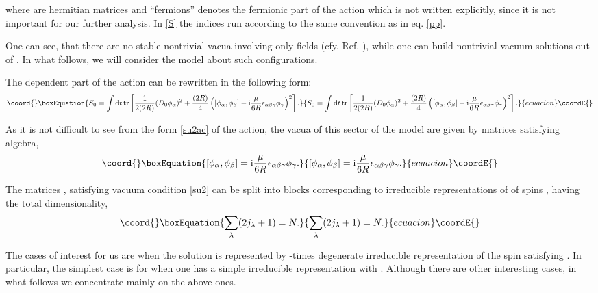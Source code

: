\documentclass[a4paper]{article}
\providecommand{\ii}{\mathrm{i}}
\providecommand{\dd}{\mathrm{d}}
\providecommand{\tr}{\mathop{\mathrm{tr}}\nolimits}
\begin{document}
where \coordHE{} are \coordHE{} hermitian matrices and ``fermions''
denotes the fermionic part of the action which is not written
explicitly, since it is not important for our further analysis. In
\eqref{S} the indices run according to the same convention as in
eq. \eqref{pp}.

One can see, that there are no stable nontrivial vacua involving
only fields \myHighlight{$\phi_\mu$}\coordHE{} (cfy. Ref. \cite{Valtancoli:2002rx}), while
one can build nontrivial vacuum solutions out of \myHighlight{$\phi_\alpha$}\coordHE{}. In
what follows, we will consider the model about such
configurations.

The \myHighlight{$\phi_\alpha$}\coordHE{} dependent part of the action can be rewritten in
the following form:
\begin{equation}\coord{}\boxEquation{\label{su2ac}
S_0=\int\dd t\tr\left[\frac{1}{2(2R)}(D_0\phi_\alpha)^2+
\frac{(2R)}{4}\left([\phi_\alpha,\phi_\beta]-
\ii\frac{\mu}{6R}\epsilon_{\alpha\beta\gamma}\phi_\gamma\right)^2\right].
}{S_0=\int\dd t\tr\left[\frac{1}{2(2R)}(D_0\phi_\alpha)^2+
\frac{(2R)}{4}\left([\phi_\alpha,\phi_\beta]-
\ii\frac{\mu}{6R}\epsilon_{\alpha\beta\gamma}\phi_\gamma\right)^2\right].
}{ecuacion}\coordE{}\end{equation}

As it is not difficult to see from the form \eqref{su2ac} of the
action, the vacua of this sector of the model are given by
matrices satisfying \coordHE{} algebra,
\begin{equation}\coord{}\boxEquation{\label{su2}
[\phi_\alpha,\phi_\beta]=
\ii\frac{\mu}{6R}\epsilon_{\alpha\beta\gamma}\phi_\gamma.
}{[\phi_\alpha,\phi_\beta]=
\ii\frac{\mu}{6R}\epsilon_{\alpha\beta\gamma}\phi_\gamma.
}{ecuacion}\coordE{}\end{equation}

The matrices \myHighlight{$\phi_\alpha$}\coordHE{}, satisfying vacuum condition
\eqref{su2} can be split into blocks corresponding to irreducible
representations \coordHE{} of \coordHE{} of spins \coordHE{},
having the total dimensionality,
\begin{equation}\coord{}\boxEquation{\label{sum-rep}
\sum_\lambda (2j_\lambda+1)=N.
}{\sum_\lambda (2j_\lambda+1)=N.
}{ecuacion}\coordE{}\end{equation}

The cases of interest for us are when the solution is represented
by \coordHE{}-times degenerate irreducible representation of the spin \coordHE{}
satisfying \coordHE{}. In particular, the simplest case is for
\coordHE{} when one has a simple irreducible representation with
\coordHE{}. Although there are other interesting cases, in what
follows we concentrate mainly on the above ones.
\end{document}
